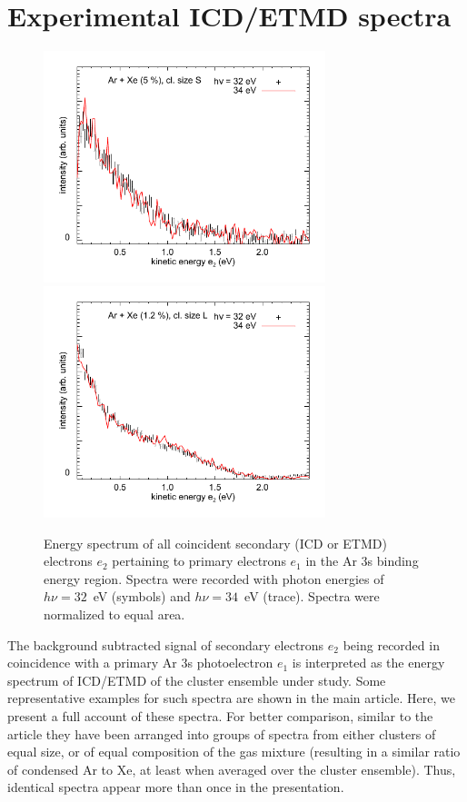 \documentclass[journal=jpccck,manuscript=suppinfo]{achemso}
\begin{document}
\section{Experimental ICD/ETMD spectra}
%
\begin{figure}
 \centering
 \includegraphics[width=8.2cm]{pics/630_631_cs.pdf}
 \includegraphics[width=8.2cm]{pics/673_674_cs.pdf}
 \caption{
Energy spectrum of all coincident secondary (ICD or ETMD) electrons $e_2$ pertaining to primary electrons $e_1$ in the Ar 3s binding energy region. 
Spectra were recorded with photon energies of $h\nu = 32$~eV (symbols) and $h\nu = 34$~eV (trace). 
Spectra were normalized to equal area. 
 \label{figure:hnucomp}
 }
\end{figure}
%
The background subtracted signal of secondary electrons $e_2$ being recorded in coincidence with a primary Ar 3s photoelectron $e_1$ is interpreted as the energy spectrum of ICD/ETMD of the cluster ensemble under study.
Some representative examples for such spectra are shown in the main article.
Here, we present a full account of these spectra.
For better comparison, similar to the article they have been arranged into groups of spectra from either clusters of equal size, or of equal composition of the gas mixture (resulting in a similar ratio of condensed Ar to Xe, at least when averaged over the cluster ensemble).
Thus, identical spectra appear more than once in the presentation.
\end{document}
